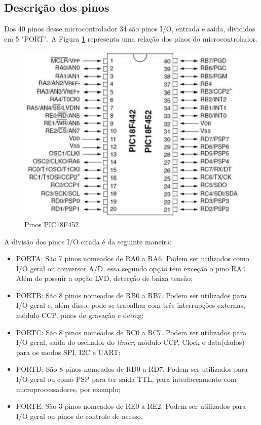 \newpage 
\subsection{Descrição dos pinos}
Dos 40 pinos desse microcontrolador 34 são pinos I/O, entrada e saída, divididos em 5 "PORT". A Figura \ref{fig:pinospic} representa uma relação dos pinos do microcontrolador.

\begin{figure}[htp]
	\centering
	\includegraphics[scale=0.6]{images/pinos_pic.png}
	\caption{Pinos PIC18F452}	
	\label{fig:pinospic}	
\end{figure}

A divisão dos pinos I/O citada é da seguinte maneira:

\begin{itemize}
\item PORTA: São 7 pinos nomeados de RA0 a RA6. Podem ser utilizados como I/O geral ou conversor A/D, essa segundo opção tem exceção o pino RA4. Além de possuir a opção LVD, detecção de baixa tensão;
\item PORTB: São 8 pinos nomeados de RB0 a RB7. Podem ser utilizados para I/O geral e, além disso, pode-se trabalhar com três interrupções externas, módulo CCP, pinos de gravação e debug;
\item PORTC: São 8 pinos nomeados de RC0 a RC7. Podem ser utilizados para I/O geral, saída do oscilador do \emph{timer}, módulo CCP, Clock e data(dados) para os modos SPI, I2C e UART;
\item PORTD: São 8 pinos nomeados de RD0 a RD7. Podem ser utilizados para I/O geral ou como PSP para ter saída TTL, para interfaceamento com microprocessadores, por exemplo;
\item PORTE: São 3 pinos nomeados de RE0 a RE2. Podem ser utilizados para I/O geral ou pinos de controle de acesso.
\end{itemize}